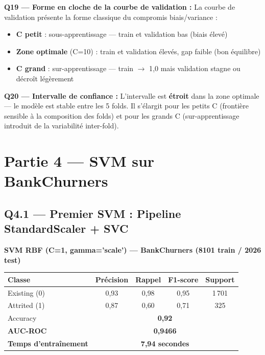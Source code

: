 \documentclass[12pt,a4paper]{article}
\begin{document}
\begin{reponsebox}
\textbf{Q19 — Forme en cloche de la courbe de validation :}
La courbe de validation présente la forme classique du compromis biais/variance :
\begin{itemize}[leftmargin=1.5em]
  \item \textbf{C petit} : sous-apprentissage — train et validation bas (biais élevé)
  \item \textbf{Zone optimale} (C=10) : train et validation élevés, gap faible (bon équilibre)
  \item \textbf{C grand} : sur-apprentissage — train $\to$ 1{,}0 mais validation stagne ou décroît légèrement
\end{itemize}

\textbf{Q20 — Intervalle de confiance :}
L'intervalle est \textbf{étroit} dans la zone optimale — le modèle est stable entre les 5 folds. Il s'élargit pour les petits C (frontière sensible à la composition des folds) et pour les grands C (sur-apprentissage introduit de la variabilité inter-fold).
\end{reponsebox}

\section{Partie 4 — SVM sur BankChurners}

\subsection{Q4.1 — Premier SVM : Pipeline StandardScaler + SVC}

\begin{resultbox}
\textbf{SVM RBF (C=1, gamma='scale') — BankChurners (8101 train / 2026 test)}
\begin{center}
\begin{tabular}{lcccc}
\toprule
\textbf{Classe} & \textbf{Précision} & \textbf{Rappel} & \textbf{F1-score} & \textbf{Support} \\
\midrule
Existing (0) & 0{,}93 & 0{,}98 & 0{,}95 & 1\,701 \\
Attrited (1) & 0{,}87 & 0{,}60 & 0{,}71 & 325 \\
\midrule
Accuracy & \multicolumn{4}{c}{\textbf{0{,}92}} \\
\midrule
\textbf{AUC-ROC} & \multicolumn{4}{c}{\textbf{0{,}9466}} \\
\textbf{Temps d'entraînement} & \multicolumn{4}{c}{\textbf{7{,}94 secondes}} \\
\bottomrule
\end{tabular}
\end{center}
\end{resultbox}
\end{document}

